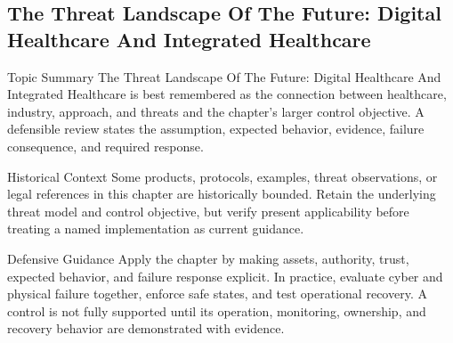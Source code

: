 \documentclass[11pt,letterpaper]{article}
\begin{document}
\subsection*{The Threat Landscape Of The Future: Digital Healthcare And Integrated Healthcare}
\begin{CornellNotesTable}
\end{CornellNotesTable}
\begin{CornellSummaryBox}{Topic Summary}
The Threat Landscape Of The Future: Digital Healthcare And Integrated Healthcare is best remembered as the connection between healthcare, industry, approach, and threats and the chapter's larger control objective. A defensible review states the assumption, expected behavior, evidence, failure consequence, and required response.
\end{CornellSummaryBox}
\begin{CornellWarningBox}{Historical Context}
Some products, protocols, examples, threat observations, or legal references in this chapter are historically bounded. Retain the underlying threat model and control objective, but verify present applicability before treating a named implementation as current guidance.
\end{CornellWarningBox}
\begin{CornellOverviewBox}{Defensive Guidance}
Apply the chapter by making assets, authority, trust, expected behavior, and failure response explicit. In practice, evaluate cyber and physical failure together, enforce safe states, and test operational recovery. A control is not fully supported until its operation, monitoring, ownership, and recovery behavior are demonstrated with evidence.
\end{CornellOverviewBox}
\end{document}
